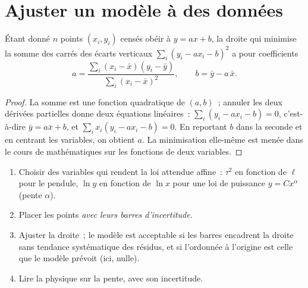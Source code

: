\section{Ajuster un modèle à des données}

\begin{proposition}\label{prop:b1:units-dimensions:regression}
Étant donné $n$ points $(x_i, y_i)$ censés obéir à $y = a x + b$, la
droite qui minimise la somme des carrés des écarts verticaux
$\sum_i (y_i - a x_i - b)^2$ a pour coefficients
\[
a = \frac{\sum_i (x_i - \bar x)(y_i - \bar y)}{\sum_i (x_i - \bar x)^2},
\qquad
b = \bar y - a\,\bar x .
\]
\end{proposition}

\begin{proof}
La somme est une fonction quadratique de $(a, b)$~; annuler les deux
dérivées partielles donne deux équations linéaires~:
$\sum_i (y_i - ax_i - b) = 0$, c'est-à-dire $\bar y = a \bar x + b$, et
$\sum_i x_i (y_i - ax_i - b) = 0$. En reportant $b$ dans la seconde et
en centrant les variables, on obtient $a$. La minimisation elle-même est
menée dans le cours de mathématiques sur les fonctions de deux variables.
\end{proof}

\begin{method}\label{met:b1:units-dimensions:fit}
\begin{enumerate}
  \item Choisir des variables qui rendent la loi attendue affine~:
        $\tau^2$ en fonction de $\ell$ pour le pendule, $\ln y$ en
        fonction de $\ln x$ pour une loi de puissance $y = Cx^\alpha$
        (pente $\alpha$).
  \item Placer les points \emph{avec leurs barres d'incertitude}.
  \item Ajuster la droite~; le modèle est acceptable si les barres
        encadrent la droite sans tendance systématique des résidus, et
        si l'ordonnée à l'origine est celle que le modèle prévoit (ici,
        nulle).
  \item Lire la physique sur la pente, avec son incertitude.
\end{enumerate}
\end{method}

